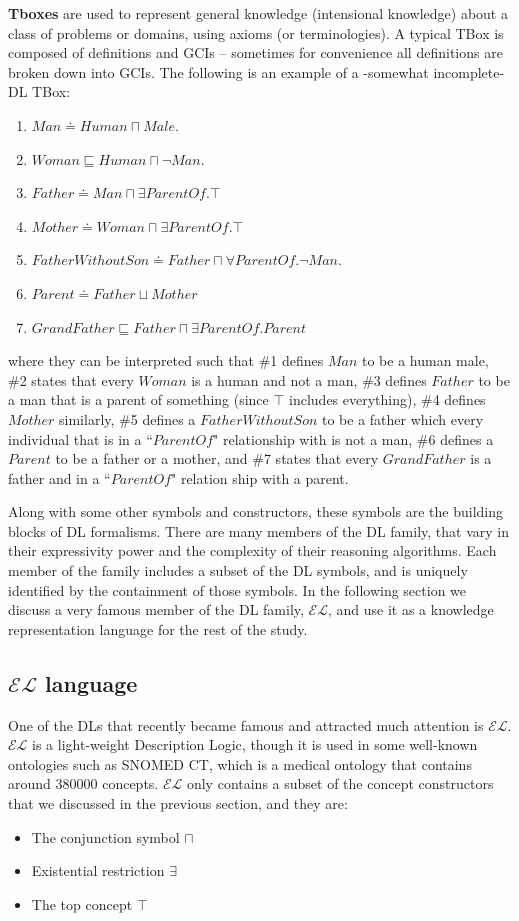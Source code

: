 \textbf{Tboxes} are used to represent general knowledge (intensional knowledge) about a class of problems or domains, using axioms (or terminologies). A typical TBox is composed of definitions and GCIs -- sometimes for convenience all definitions are broken down into GCIs. The following is an example of a -somewhat incomplete- DL TBox:
\begin{enumerate}
\item $Man \doteq Human \sqcap Male$.
\item $Woman \sqsubseteq Human \sqcap \neg Man$.
\item $Father \doteq Man \sqcap \exists ParentOf. \top$
\item $Mother \doteq Woman \sqcap \exists ParentOf. \top$
\item $FatherWithoutSon \doteq Father \sqcap \forall ParentOf. \neg Man$.
\item $Parent \doteq Father \sqcup Mother$
\item $GrandFather \sqsubseteq Father \sqcap \exists ParentOf.Parent$
\end{enumerate}
where they can be interpreted such that \#1 defines $Man$ to be a human male, \#2 states that every $Woman$ is a human and not a man, \#3 defines $Father$ to be a man that is a parent of something (since $\top$ includes everything), \#4 defines $Mother$ similarly, \#5 defines a $FatherWithoutSon$ to be a father which every individual that is in a ``$ParentOf$" relationship with is not a man, \#6 defines a $Parent$ to be a father or a mother, and \#7 states that every $GrandFather$ is a father and in a ``$ParentOf$" relation ship with a parent.

Along with some other symbols and constructors, these symbols are the building blocks of DL formalisms. There are many members of the DL family, that vary in their expressivity power and the complexity of their reasoning algorithms. Each member of the family includes a subset of the DL symbols, and is uniquely identified by the containment of those symbols. In the following section we discuss a very famous member of the DL family, $\mathcal{EL}$, and use it as a knowledge representation language for the rest of the study.


\subsection{$\mathcal{EL}$ language}
One of the DLs that recently became famous and attracted much attention is $\mathcal{EL}$. $\mathcal{EL}$ is a light-weight Description Logic, though it is used in some well-known ontologies such as SNOMED CT, which is a medical ontology that contains around 380000 concepts\cite{new}. $\mathcal{EL}$ only contains a subset of the concept constructors that we discussed in the previous section, and they are:
\begin{itemize}
\item The conjunction symbol $\sqcap$
\item Existential restriction $\exists$
\item The top concept $\top$
\end{itemize}

